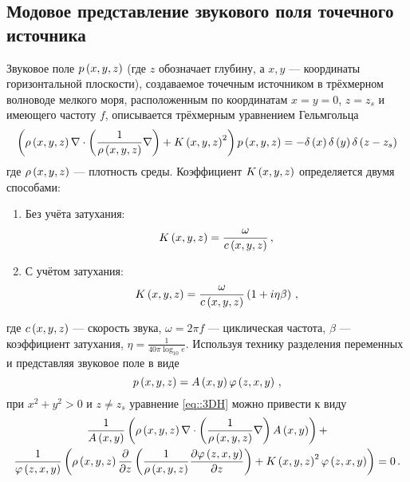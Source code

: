 \documentclass[../document.tex]{subfiles}
\begin{document}
		\subsection{Модовое представление звукового поля точечного источника\label{sec::sound_modes}}
			\par Звуковое поле $p\left(x,y,z\right)$ (где $z$ обозначает глубину, а  $x,y$ --- координаты горизонтальной плоскости), создаваемое точечным источником в трёхмерном волноводе мелкого моря, расположенным по координатам $x=y=0$, $z=z_s$ и имеющего частоту $f$, описывается трёхмерным уравнением Гельмгольца \cite{jensen}
			\begin{equation}\label{eq::3DH}
				\left(\rho\left(x,y,z\right)\nabla\cdot\left(\frac{1}{\rho\left(x,y,z\right)}\nabla\right) + K\left(x,y,z\right)^2\right)p\left(x,y,z\right)=-\delta\left(x\right)\delta\left(y\right)\delta\left(z-z_s\right)
			\end{equation}
			где $\rho\left(x,y,z\right)$ --- плотность среды. Коэффициент $K\left(x,y,z\right)$ определяется двумя способами:
			\begin{enumerate}
				\item Без учёта затухания:
				\begin{equation}\label{eq::K1}
					K\left(x,y,z\right)=\frac{\omega}{c\left(x,y,z\right)}\,,
				\end{equation}
				\item С учётом затухания:
				\begin{equation}\label{eq::K2}
					K\left(x,y,z\right)=\frac{\omega}{c\left(x,y,z\right)}\left(1+i\eta\beta\right)\,,
				\end{equation}
			\end{enumerate}
			где $c\left(x,y,z\right)$ --- скорость звука, $\omega=2\pi f$ --- циклическая частота, $\beta$ --- коэффициент затухания, $\eta=\frac{1}{40\pi\log_{10}e}$. Используя технику разделения переменных и представляя звуковое поле в виде
            \begin{equation}
                p\left(x,y,z\right)=A\left(x,y\right)\varphi\left(z,x,y\right)\,,
            \end{equation}
            при $x^2+y^2>0$ и $z\ne z_s$ уравнение \eqref{eq::3DH} можно привести к виду
            \begin{multline}\label{eq::modal_pe}
                \frac{1}{A\left(x,y\right)}\left(\rho\left(x,y,z\right)\nabla\cdot\left(\frac{1}{\rho\left(x,y,z\right)}\nabla\right)A\left(x,y\right)\right)+\\
                \frac{1}{\varphi\left(z,x,y\right)}\left(\rho\left(x,y,z\right)\frac{\partial}{\partial z}\left(\frac{1}{\rho\left(x,y,z\right)}\frac{\partial\varphi\left(z,x,y\right)}{\partial z}\right)+K\left(x,y,z\right)^2\varphi\left(z,x,y\right)\right)=0\,.
            \end{multline}
\end{document}
